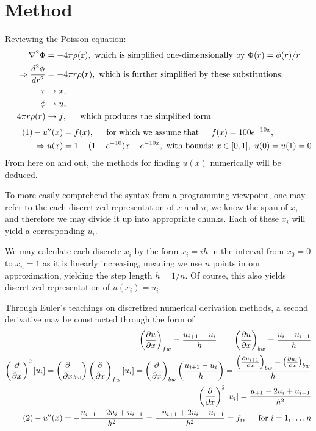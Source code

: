 \documentclass[11pt,a4paper,notitlepage]{article}
\newcommand\pd[2]{\frac{\partial #1}{\partial #2}}
\begin{document}
\section{Method}


\label{section:method}
Reviewing the Poisson equation:
\begin{align*}
\nabla ^2 \Phi &= -4\pi\rho(\mathbf{r}), \ \text{which is simplified one-dimensionally by} \ \Phi(r) = \phi(r)/r \\
\Rightarrow \frac{d^2 \phi}{dr^2} &= -4\pi r \rho(r), \ \text{which is further simplified by these substitutions:}\\
r &\rightarrow x, \\
\phi &\rightarrow u,\\
4\pi r\rho(r) &\rightarrow f, \indent \text{which produces the simplified form}
\end{align*}\begin{align*}\label{eq:1}\tag{1}
-u''(x) &= f(x), \indent \text{for which we assume that} \indent f(x) = 100e^{-10x}, \\
\Rightarrow u(x) &= 1- (1-e^{-10})x - e^{-10x},\ \text{with bounds:}\ x \in [0,1],\ u(0) = u(1)= 0
\end{align*}
From here on and out, the methods for finding $u(x)$ numerically will be deduced.

To more easily comprehend the syntax from a programming viewpoint, one may refer to the each discretized representation of $x$ and $u$; we know the span of $x$, and therefore we may divide it up into appropriate chunks. Each of these $x_i$ will yield a corresponding $u_i$.

We may calculate each discrete $x_i$ by the form $x_i = ih$ in the interval from $x_0 = 0$ to $x_{n} = 1$ as it is linearly increasing, meaning we use $n$ points in our approximation, yielding the step length $h = 1/n$. Of course, this also yields discretized representation of $u(x_i) = u_i$.

Through Euler's teachings on discretized numerical derivation methods, a second derivative may be constructed through the form of
\begin{align}
\nonumber
\left(\pd{u}{x}\right)_{fw} = \frac{u_{i+1} - u_i}{h} \quad\quad
\left(\pd{u}{x}\right)_{bw} = \frac{u_{i} - u_{i-1}}{h} \\
\nonumber
\left(\pd{}{x}\right)^2[u_i] = \left(\pd{}{x}_{bw}\right)\left(\pd{}{x}\right)_{fw}[u_i] = \left(\pd{}{x}\right)_{bw}\left(\frac{u_{i+1} - u_i}{h}\right) =\frac{\left(\pd{u_{i+1}}{x}\right)_{bw} - \left(\pd{u_i}{x}\right)_{bw}}{h} \\
\nonumber
\left(\pd{}{x}\right)^2[u_i] = \frac{u_{+1} - 2u_i + u_{i-1}}{h^2}\\
\label{eq:2} \tag{2}
-u''(x) = - \frac{u_{i+1} - 2u_i + u_{i-1}}{h^2} = \frac{- u_{i+1} + 2u_i - u_{i-1}}{h^2} = f_i , \indent \text{for}\ i = 1, \hdots, n
\end{align}
\end{document}
